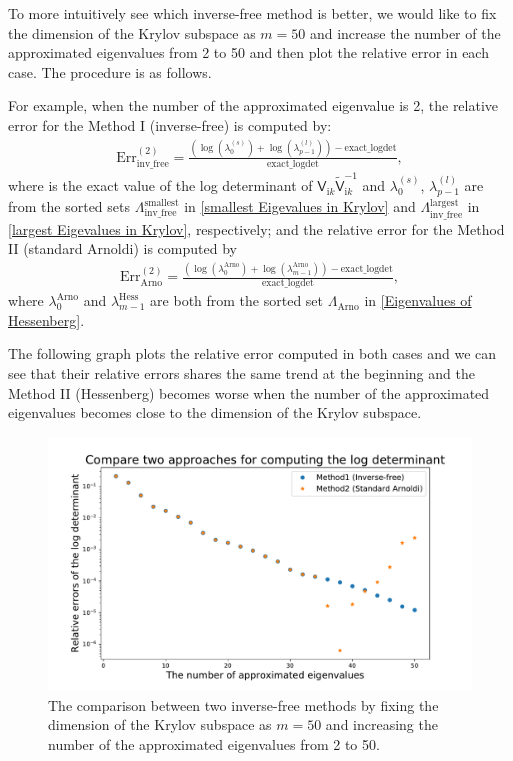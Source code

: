 To more intuitively see which inverse-free method is better, we would like to fix the dimension of the Krylov subspace as $m = 50$ and increase the number of 
the approximated eigenvalues from 2 to 50 and then plot the relative error in each case. The procedure is as follows.

For example, when the number of the approximated eigenvalue is 2, the relative error for the Method I (inverse-free) is computed by:
\begin{align*}
    \text{Err}^{(2)}_{\text{inv\_free}} = \frac{\left(\log(\lambda_{0}^{(s)}) + \log(\lambda_{p-1}^{(l)})\right) - \text{exact\_logdet}}{\text{exact\_logdet}},
\end{align*}
where  is the exact value of the log determinant of $\mathsf{V}_{\mathrm{i}k}\tilde{\mathsf{V}}_{\mathrm{i}k}^{-1}$ and  
$\lambda_{0}^{(s)}$, $\lambda_{p-1}^{(l)}$ are from the sorted sets $\Lambda_{\text{inv\_free}}^{\text{smallest}}$ in \eqref{smallest Eigevalues in Krylov} and 
$\Lambda_{\text{inv\_free}}^{\text{largest}}$ in \eqref{largest Eigevalues in Krylov}, respectively;
and the relative error for the Method II (standard Arnoldi) is computed by
\begin{align*}
    \text{Err}^{(2)}_{\text{Arno}} = \frac{\left(\log(\lambda_{0}^{\text{Arno}}) + \log(\lambda_{m-1}^{\text{Arno}})\right) - \text{exact\_logdet}}{\text{exact\_logdet}},
\end{align*}
where $\lambda_{0}^{\text{Arno}}$ and $\lambda_{m-1}^{\text{Hess}}$ are both from the sorted set $\Lambda_{\text{Arno}}$ in \eqref{Eigenvalues of Hessenberg}.

The following graph plots the relative error computed in both cases and we can see that their relative errors shares the same trend at the beginning and 
the Method II (Hessenberg) becomes worse when the number of the approximated eigenvalues becomes close to the dimension of the Krylov subspace.

\begin{figure}[H]
    \centering
    \includegraphics[scale = 0.5]{figures/compare_two_inv_free_approaches.pdf}
    \caption{The comparison between two inverse-free methods by fixing the dimension of the Krylov subspace as $m = 50$ and increasing the number of the 
    approximated eigenvalues from 2 to 50.}
\end{figure}
